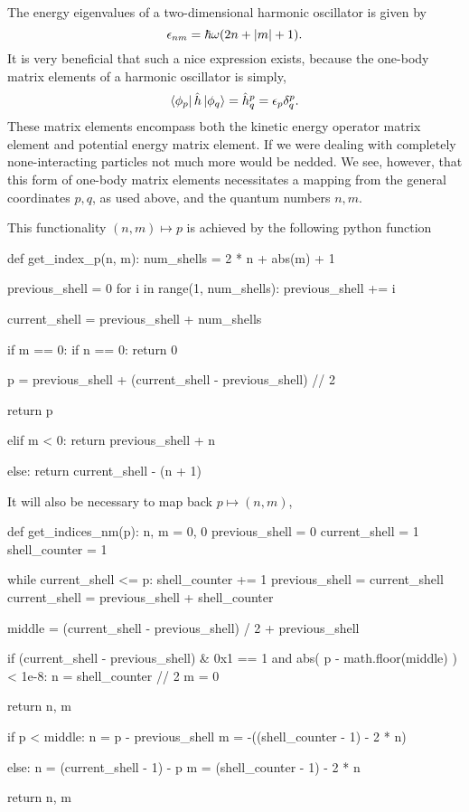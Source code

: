 The energy eigenvalues of a two-dimensional harmonic oscillator is given by 
\begin{equation}
    \epsilon_{nm} = \hbar\omega(2n + \abs{m} + 1).
\end{equation}
It is very beneficial that such a nice expression exists, because the one-body 
matrix elements of a harmonic oscillator is simply,
\begin{equation}
    \bra{\phi_p}\hat{h}\ket{\phi_q} = \hat{h}^p_q = \epsilon_p \delta^p_q.
\end{equation}
These matrix elements encompass both the kinetic energy operator matrix element and 
potential energy matrix element. If we were dealing with completely none-interacting 
particles not much more would be nedded.
We see, however, that this form of one-body matrix elements necessitates a mapping from 
the general coordinates $p,q$, as used above, and the quantum numbers $n,m$.

This functionality $(n,m)\mapsto p$ is 
achieved by the following python function
\begin{python}
def get_index_p(n, m):
    num_shells = 2 * n + abs(m) + 1

    previous_shell = 0
    for i in range(1, num_shells):
        previous_shell += i

    current_shell = previous_shell + num_shells

    if m == 0:
        if n == 0:
            return 0

        p = previous_shell + (current_shell - previous_shell) // 2

        return p

    elif m < 0:
        return previous_shell + n

    else:
        return current_shell - (n + 1)
\end{python}
It will also be necessary to map back $p\mapsto(n,m)$,
\begin{python}
def get_indices_nm(p):
    n, m = 0, 0
    previous_shell = 0
    current_shell = 1
    shell_counter = 1

    while current_shell <= p:
        shell_counter += 1
        previous_shell = current_shell
        current_shell = previous_shell + shell_counter

    middle = (current_shell - previous_shell) / 2 + previous_shell

    if (current_shell - previous_shell) & 0x1 == 1 and abs(
        p - math.floor(middle)
    ) < 1e-8:
        n = shell_counter // 2
        m = 0

        return n, m

    if p < middle:
        n = p - previous_shell
        m = -((shell_counter - 1) - 2 * n)

    else:
        n = (current_shell - 1) - p
        m = (shell_counter - 1) - 2 * n

    return n, m
\end{python}

